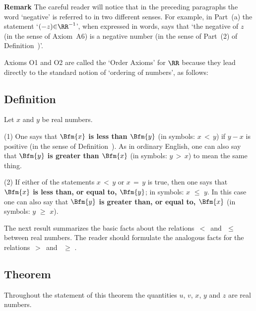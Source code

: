         {\bf Remark} The careful reader will notice that in the preceding paragraphs the word `negative' is referred to in two different senses.
    For example, in Part~(a) the statement `$(-z){\in}{\RR}^{-1}$', when expressed in words,
    says that `the negative of $z$ (in the sense of Axiom~A6) is a negative number (in the sense of Part~(2) of Definition~)'.

\V
\V

        Axioms O1 and O2 are called the `Order Axioms' for ${\RR}$ because they lead directly to the standard notion of `ordering of numbers', as follows:

\V

            \subsection{\small{\bf Definition}}
            \label{DefB20.30}

        Let $x$ and $y$ be real numbers.

\V

        (1) One says that {\bf $\Bfm{x}$ is less than $\Bfm{y}$} (in symbols: $x\,<\,y$) if $y-x$ is positive (in the sense of Definition~).
    As in ordinary English, one can also say that {\bf $\Bfm{y}$ is greater than $\Bfm{x}$} (in symbols: $y\,>\,x$) to mean the same thing.

\V

        (2) If either of the statements $x\,<\,y$ or $x \,=\, y$ is true, then one says that
    {\bf $\Bfm{x}$ is less than, or equal to, $\Bfm{y}$}; in symbols: $x\,\,{\leq}\,\,y$.
    In this case one can also say that {\bf $\Bfm{y}$ is greater than, or equal to, $\Bfm{x}$} (in symbols: $y\,\,{\geq}\,\,x$).


\V
\V

        The next result summarizes the basic facts about the relations $\,<\,$ and $\,\,{\leq}\,\,$ between real numbers.
    The reader should formulate the analogous facts for the relations $\,>\,$ and~$\,\,{\geq}\,\,$.

\V

            \subsection{\small{\bf Theorem}}
            \label{ThmB20.40}

        Throughout the statement of this theorem the quantities $u$, $v$, $x$, $y$ and $z$ are real numbers.

